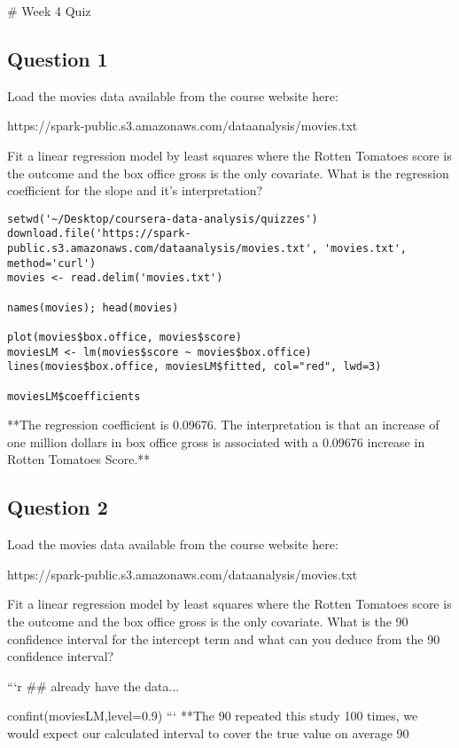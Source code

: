 # Week 4 Quiz

\subsection{Question 1}
Load the movies data available from the course website here: 

https://spark-public.s3.amazonaws.com/dataanalysis/movies.txt

Fit a linear regression model by least squares where the Rotten Tomatoes score
is the outcome and the box office gross is the only covariate. What is the
regression coefficient for the slope and it's interpretation?

\begin{verbatim}
setwd('~/Desktop/coursera-data-analysis/quizzes')
download.file('https://spark-public.s3.amazonaws.com/dataanalysis/movies.txt', 'movies.txt', method='curl')
movies <- read.delim('movies.txt')

names(movies); head(movies)

plot(movies$box.office, movies$score)
moviesLM <- lm(movies$score ~ movies$box.office)
lines(movies$box.office, moviesLM$fitted, col="red", lwd=3)

moviesLM$coefficients
\end{verbatim}

**The regression coefficient is 0.09676. The interpretation is that an increase
of one million dollars in box office gross is associated with a 0.09676 increase
in Rotten Tomatoes Score.**
\subsection{Question 2}

Load the movies data available from the course website here: 

https://spark-public.s3.amazonaws.com/dataanalysis/movies.txt

Fit a linear regression model by least squares where the Rotten Tomatoes score
is the outcome and the box office gross is the only covariate. What is the 90%
confidence interval for the intercept term and what can you deduce from the 90%
confidence interval?

```{r}
## already have the data...

confint(moviesLM,level=0.9)
```
**The 90%
repeated this study 100 times, we would expect our calculated interval to cover
the true value on average 90%
